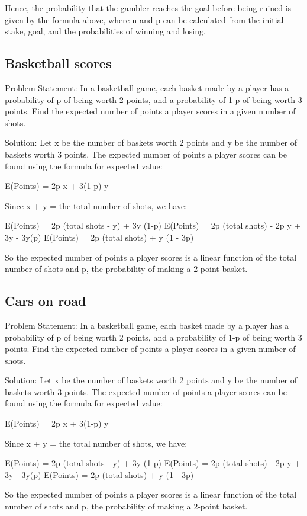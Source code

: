 \documentclass[12pt, a4paper, oneside]{article}
\begin{document}
Hence, the probability that the gambler reaches the goal before being ruined is given by the formula above, where n and p can be calculated from the initial stake, goal, and the probabilities of winning and losing.
\subsection{ Basketball scores }
Problem Statement:
In a basketball game, each basket made by a player has a probability of p of being worth 2 points, and a probability of 1-p of being worth 3 points. Find the expected number of points a player scores in a given number of shots.

Solution:
Let x be the number of baskets worth 2 points and y be the number of baskets worth 3 points. The expected number of points a player scores can be found using the formula for expected value:

E(Points) = 2p x + 3(1-p) y

Since x + y = the total number of shots, we have:

E(Points) = 2p (total shots - y) + 3y (1-p)
E(Points) = 2p (total shots) - 2p y + 3y - 3y(p)
E(Points) = 2p (total shots) + y (1 - 3p)

So the expected number of points a player scores is a linear function of the total number of shots and p, the probability of making a 2-point basket.
\subsection{ Cars on road }
Problem Statement:
In a basketball game, each basket made by a player has a probability of p of being worth 2 points, and a probability of 1-p of being worth 3 points. Find the expected number of points a player scores in a given number of shots.

Solution:
Let x be the number of baskets worth 2 points and y be the number of baskets worth 3 points. The expected number of points a player scores can be found using the formula for expected value:

E(Points) = 2p x + 3(1-p) y

Since x + y = the total number of shots, we have:

E(Points) = 2p (total shots - y) + 3y (1-p)
E(Points) = 2p (total shots) - 2p y + 3y - 3y(p)
E(Points) = 2p (total shots) + y (1 - 3p)

So the expected number of points a player scores is a linear function of the total number of shots and p, the probability of making a 2-point basket.
\end{document}
